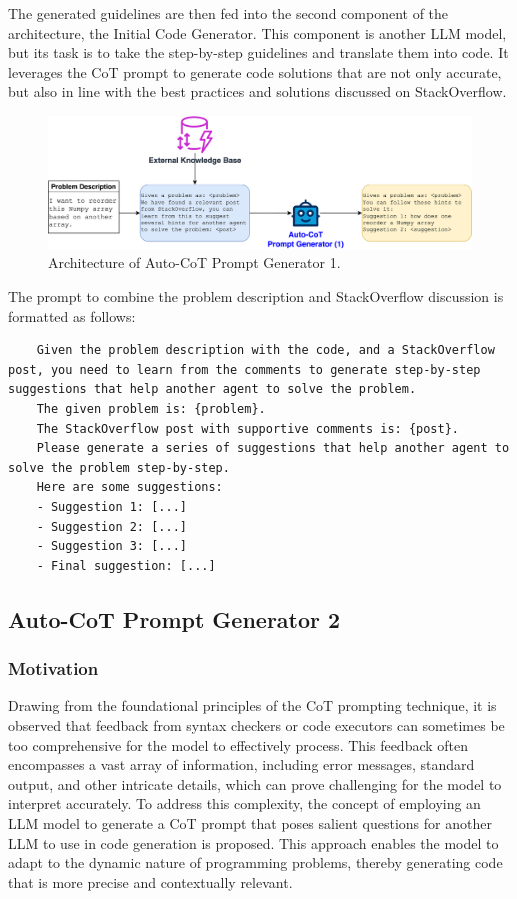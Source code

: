 \documentclass[a4paper,oneside]{book}
\begin{document}
The generated guidelines are then fed into the second component of the architecture, the Initial Code Generator. This component is another LLM model, but its task is to take the step-by-step guidelines and translate them into code. It leverages the CoT prompt to generate code solutions that are not only accurate, but also in line with the best practices and solutions discussed on StackOverflow.

\begin{figure}[H]
    \centering
    \includegraphics[width=1.0\textwidth]{img/cot_generator_1}
    \caption{Architecture of Auto-CoT Prompt Generator 1.}\label{fig:cot_generator_1}
\end{figure}

The prompt to combine the problem description and StackOverflow discussion is formatted as follows:

\begin{lstlisting}
    Given the problem description with the code, and a StackOverflow post, you need to learn from the comments to generate step-by-step suggestions that help another agent to solve the problem.
    The given problem is: {problem}.
    The StackOverflow post with supportive comments is: {post}.
    Please generate a series of suggestions that help another agent to solve the problem step-by-step.
    Here are some suggestions:
    - Suggestion 1: [...]
    - Suggestion 2: [...]
    - Suggestion 3: [...]
    - Final suggestion: [...]
\end{lstlisting}

\subsection{Auto-CoT Prompt Generator 2}
\subsubsection{Motivation}
Drawing from the foundational principles of the CoT prompting technique, it is observed that feedback from syntax checkers or code executors can sometimes be too comprehensive for the model to effectively process. This feedback often encompasses a vast array of information, including error messages, standard output, and other intricate details, which can prove challenging for the model to interpret accurately. To address this complexity, the concept of employing an LLM model to generate a CoT prompt that poses salient questions for another LLM to use in code generation is proposed. This approach enables the model to adapt to the dynamic nature of programming problems, thereby generating code that is more precise and contextually relevant.
\end{document}
